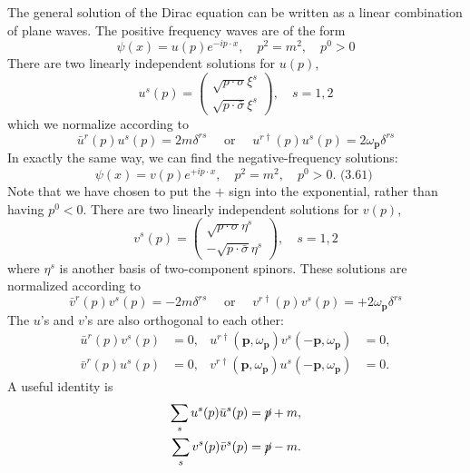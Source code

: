 The general solution of the Dirac equation can be written as a linear combination of plane waves. 
The positive frequency waves are of the form
\begin{equation*}
	\psi(x)=u(p) e^{-i p \cdot x}, \quad p^{2}=m^{2}, \quad p^{0}>0
\end{equation*}
There are two linearly independent solutions for $u(p)$,
\begin{equation*}
	u^{s}(p)=\left(\begin{array}{c}
	\sqrt{p \cdot \sigma} \xi^{s} \\
	\sqrt{p \cdot \bar{\sigma}} \xi^{s}
	\end{array}\right), \quad s=1,2
\end{equation*}
which we normalize according to
\begin{equation*}
	\bar{u}^{r}(p) u^{s}(p)=2 m \delta^{r s} \quad \text { or } \quad u^{r \dagger}(p) u^{s}(p)=2 \omega_{\bm p} \delta^{r s}
\end{equation*}
In exactly the same way, we can find the negative-frequency solutions:
\begin{equation*}
	\psi(x)=v(p) e^{+i p \cdot x}, \quad p^{2}=m^{2}, \quad p^{0}>0 \text {. (3.61) }
\end{equation*}
Note that we have chosen to put the $+$ sign into the exponential, rather than having $p^{0}<0$.
There are two linearly independent solutions for $v(p)$,
\begin{equation*}
	v^{s}(p)=\left(\begin{array}{c}
		\sqrt{p \cdot \sigma} \eta^{s} \\
		-\sqrt{p \cdot \bar{\sigma}} \eta^{s}
	\end{array}\right), \quad s=1,2
\end{equation*}
where $\eta^{s}$ is another basis of two-component spinors. These solutions are normalized according to
\begin{equation*}
	\bar{v}^{r}(p) v^{s}(p)=-2 m \delta^{r s} \quad \text { or } \quad v^{r \dagger}(p) v^{s}(p)=+2 \omega_{\bm{p}} \delta^{r s}
\end{equation*}
The $u$'s and $v$'s are also orthogonal to each other:
\begin{equation*}
\begin{aligned}
	\bar{u}^{r}(p) v^{s}(p) &=0, & 
	u^{r\dagger}(\bm p,\omega_{\bm p}) v^{s}(-\bm p,\omega_{\bm p}) &=0, \\
	\bar{v}^{r}(p) u^{s}(p) &=0, & 
	v^{r\dagger}(\bm p,\omega_{\bm p}) u^{s}(-\bm p,\omega_{\bm p}) &=0.
\end{aligned}
\end{equation*}
A useful identity is
\begin{equation*}
\begin{aligned}
	\sum_{s} u^{s}(p) \bar{u}^{s}(p) &= \cancel p+m, \\
	\sum_{s} v^{s}(p) \bar{v}^{s}(p) &= \cancel p-m.
\end{aligned}
\end{equation*}


